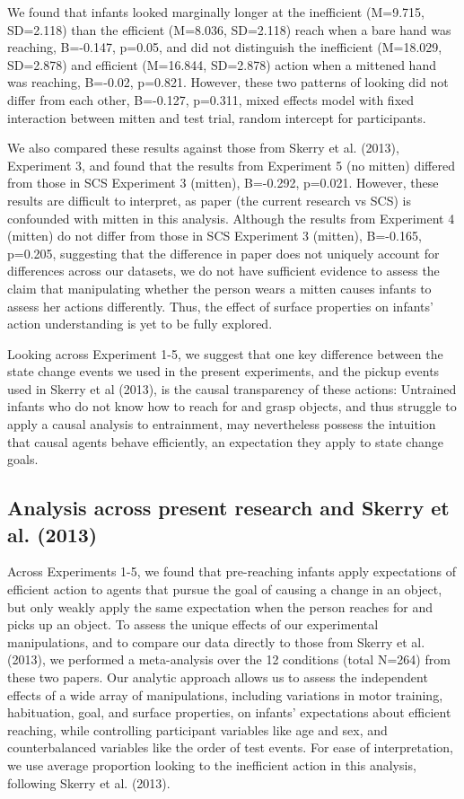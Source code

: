 \documentclass[]{article}
\begin{document}
We found that infants looked marginally longer at the inefficient
(M=9.715, SD=2.118) than the efficient (M=8.036, SD=2.118) reach when a
bare hand was reaching, B=-0.147, p=0.05, and did not distinguish the
inefficient (M=18.029, SD=2.878) and efficient (M=16.844, SD=2.878)
action when a mittened hand was reaching, B=-0.02, p=0.821. However,
these two patterns of looking did not differ from each other, B=-0.127,
p=0.311, mixed effects model with fixed interaction between mitten and
test trial, random intercept for participants.

We also compared these results against those from Skerry et al. (2013),
Experiment 3, and found that the results from Experiment 5 (no mitten)
differed from those in SCS Experiment 3 (mitten), B=-0.292, p=0.021.
However, these results are difficult to interpret, as paper (the current
research vs SCS) is confounded with mitten in this analysis. Although
the results from Experiment 4 (mitten) do not differ from those in SCS
Experiment 3 (mitten), B=-0.165, p=0.205, suggesting that the difference
in paper does not uniquely account for differences across our datasets,
we do not have sufficient evidence to assess the claim that manipulating
whether the person wears a mitten causes infants to assess her actions
differently. Thus, the effect of surface properties on infants' action
understanding is yet to be fully explored.

Looking across Experiment 1-5, we suggest that one key difference
between the state change events we used in the present experiments, and
the pickup events used in Skerry et al (2013), is the causal
transparency of these actions: Untrained infants who do not know how to
reach for and grasp objects, and thus struggle to apply a causal
analysis to entrainment, may nevertheless possess the intuition that
causal agents behave efficiently, an expectation they apply to state
change goals.

\subsection{Analysis across present research and Skerry et al.
(2013)}\label{analysis-across-present-research-and-skerry-et-al.-2013}

Across Experiments 1-5, we found that pre-reaching infants apply
expectations of efficient action to agents that pursue the goal of
causing a change in an object, but only weakly apply the same
expectation when the person reaches for and picks up an object. To
assess the unique effects of our experimental manipulations, and to
compare our data directly to those from Skerry et al. (2013), we
performed a meta-analysis over the 12 conditions (total N=264) from
these two papers. Our analytic approach allows us to assess the
independent effects of a wide array of manipulations, including
variations in motor training, habituation, goal, and surface properties,
on infants' expectations about efficient reaching, while controlling
participant variables like age and sex, and counterbalanced variables
like the order of test events. For ease of interpretation, we use
average proportion looking to the inefficient action in this analysis,
following Skerry et al. (2013).
\end{document}
